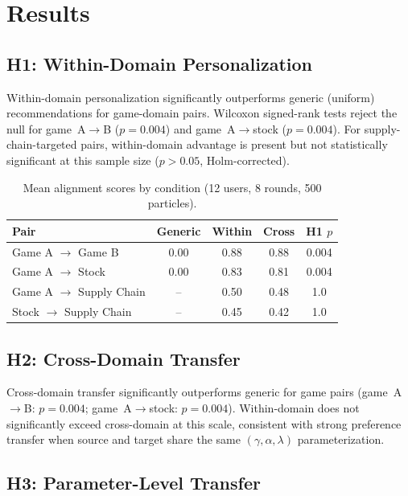 \documentclass[11pt]{article}
\begin{document}
\section{Results}

\subsection{H1: Within-Domain Personalization}

Within-domain personalization significantly outperforms generic (uniform)
recommendations for game-domain pairs.  Wilcoxon signed-rank tests reject
the null for game~A$\to$B ($p = 0.004$) and game~A$\to$stock ($p = 0.004$).
For supply-chain-targeted pairs, within-domain advantage is present but not
statistically significant at this sample size ($p > 0.05$, Holm-corrected).

\begin{table}[h]
\centering
\begin{tabular}{lcccc}
\toprule
Pair & Generic & Within & Cross & H1 $p$ \\
\midrule
Game A $\to$ Game B & 0.00 & 0.88 & 0.88 & 0.004 \\
Game A $\to$ Stock & 0.00 & 0.83 & 0.81 & 0.004 \\
Game A $\to$ Supply Chain & -- & 0.50 & 0.48 & 1.0 \\
Stock $\to$ Supply Chain & -- & 0.45 & 0.42 & 1.0 \\
\bottomrule
\end{tabular}
\caption{Mean alignment scores by condition (12 users, 8 rounds, 500 particles).}
\label{tab:h1_results}
\end{table}

\subsection{H2: Cross-Domain Transfer}

Cross-domain transfer significantly outperforms generic for game pairs
(game~A$\to$B: $p = 0.004$; game~A$\to$stock: $p = 0.004$).  Within-domain
does not significantly exceed cross-domain at this scale, consistent with
strong preference transfer when source and target share the same
$(\gamma, \alpha, \lambda)$ parameterization.

\subsection{H3: Parameter-Level Transfer}
\end{document}
